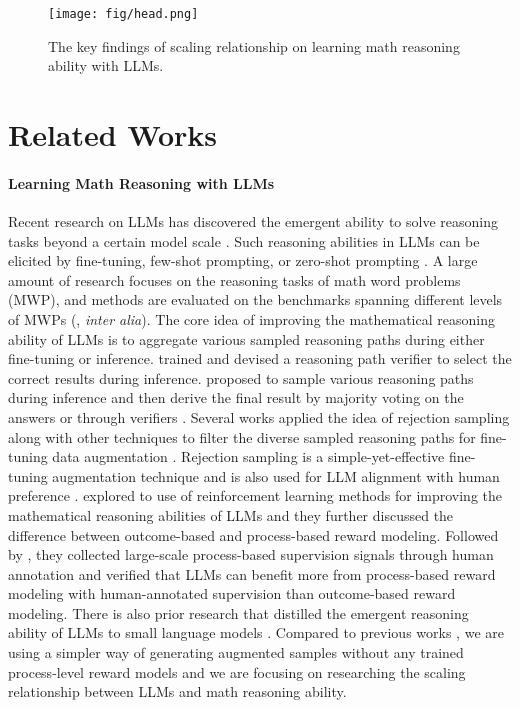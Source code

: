 \documentclass{article} \usepackage{iclr2021_conference,times}
\begin{document}
\begin{figure}[t]
    \centering
    \texttt{[image: fig/head.png]}
    \caption{The key findings of scaling relationship on learning math reasoning ability with LLMs.}
    \label{fig:head}
\end{figure}

\section{Related Works}

\paragraph{Learning Math Reasoning with LLMs} Recent research on LLMs has discovered the emergent ability to solve reasoning tasks beyond a certain model scale \citep{Wei2022EmergentAO}. Such reasoning abilities in LLMs can be elicited by fine-tuning, few-shot prompting, or zero-shot prompting  \citep{gsm8k,Wei2021FinetunedLM,nye2021work,Wei2022ChainOT,kojima2022large}. A large amount of research focuses on the reasoning tasks of math word problems (MWP), and methods are evaluated on the benchmarks spanning different levels of MWPs (\citet{koncel-kedziorski-etal-2016-mawps,patel-etal-2021-nlp,lan2021mwptoolkit,gsm8k,jie-etal-2022-learning,math401,fu2023chainofthought}, \textit{inter alia}). The core idea of improving the mathematical reasoning ability of LLMs is to aggregate various sampled reasoning paths during either fine-tuning or inference. 
\citet{gsm8k} trained and devised a reasoning path verifier to select the correct results during inference. \citet{wang2023selfconsistency} proposed to sample various reasoning paths during inference and then derive the final result by majority voting on the answers or through verifiers \citep{li-etal-2023-making}. 
Several works applied the idea of rejection sampling along with other techniques to filter the diverse sampled reasoning paths for fine-tuning data augmentation \citep{huang2022large,zelikman2022star,ni2023learning,zhu-etal-2023-solving}. 
Rejection sampling is a simple-yet-effective fine-tuning augmentation technique and is also used for LLM alignment with human preference \citep{bai2022constitutional,yuan2023rrhf,dong2023raft,llama2,song2023preference}. 
\citet{uesato2022solving} explored to use of reinforcement learning methods for improving the mathematical reasoning abilities of LLMs and they further discussed the difference between outcome-based and process-based reward modeling. Followed by \citet{lightman2023lets}, they collected large-scale process-based supervision signals through human annotation and verified that LLMs can benefit more from process-based reward modeling with human-annotated supervision than outcome-based reward modeling. There is also prior research that distilled the emergent reasoning ability of LLMs to small language models \citep{fu2023specializing,shridhar-etal-2023-distilling}.
Compared to previous works \citep{zelikman2022star,uesato2022solving,zhu-etal-2023-solving,ni2023learning}, we are using a simpler way of generating augmented samples without any trained process-level reward models and we are focusing on researching the scaling relationship between LLMs and math reasoning ability.
\end{document}
